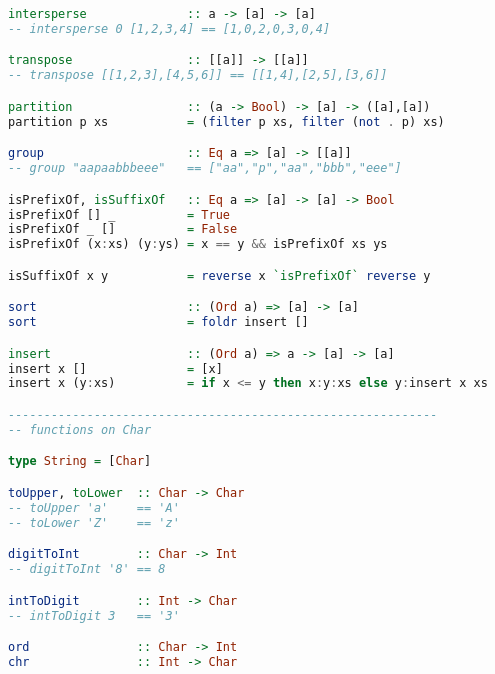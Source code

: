 \documentclass[a4paper]{article}
\begin{document}
\begin{lstlisting}[numbers=none, multicols=2,language=Haskell]
intersperse              :: a -> [a] -> [a]
-- intersperse 0 [1,2,3,4] == [1,0,2,0,3,0,4]

transpose                :: [[a]] -> [[a]]
-- transpose [[1,2,3],[4,5,6]] == [[1,4],[2,5],[3,6]]

partition                :: (a -> Bool) -> [a] -> ([a],[a])
partition p xs           = (filter p xs, filter (not . p) xs)

group                    :: Eq a => [a] -> [[a]]
-- group "aapaabbbeee"   == ["aa","p","aa","bbb","eee"]

isPrefixOf, isSuffixOf   :: Eq a => [a] -> [a] -> Bool
isPrefixOf [] _          = True
isPrefixOf _ []          = False
isPrefixOf (x:xs) (y:ys) = x == y && isPrefixOf xs ys

isSuffixOf x y           = reverse x `isPrefixOf` reverse y

sort                     :: (Ord a) => [a] -> [a]
sort                     = foldr insert []

insert                   :: (Ord a) => a -> [a] -> [a]
insert x []              = [x]
insert x (y:xs)          = if x <= y then x:y:xs else y:insert x xs

------------------------------------------------------------
-- functions on Char

type String = [Char]

toUpper, toLower  :: Char -> Char 
-- toUpper 'a'    == 'A'
-- toLower 'Z'    == 'z'

digitToInt        :: Char -> Int 
-- digitToInt '8' == 8

intToDigit        :: Int -> Char 
-- intToDigit 3   == '3'

ord               :: Char -> Int 
chr               :: Int -> Char
\end{lstlisting}
\end{document}
